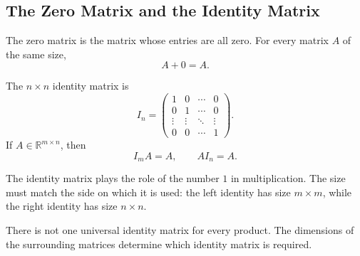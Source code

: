 \subsection{The Zero Matrix and the Identity Matrix}

\begin{definitionbox}
The zero matrix is the matrix whose entries are all zero. For every matrix $A$ of
the same size,
\[
A+0=A.
\]
\end{definitionbox}

\begin{definitionbox}
The $n\times n$ identity matrix is
\[
I_n=
\begin{pmatrix}
1&0&\cdots&0\\
0&1&\cdots&0\\
\vdots&\vdots&\ddots&\vdots\\
0&0&\cdots&1
\end{pmatrix}.
\]
If $A\in\mathbb R^{m\times n}$, then
\[
I_mA=A,
\qquad
AI_n=A.
\]
\end{definitionbox}

\begin{interpretationbox}
The identity matrix plays the role of the number $1$ in multiplication. The size
must match the side on which it is used: the left identity has size $m\times m$,
while the right identity has size $n\times n$.
\end{interpretationbox}

\begin{remarkbox}
There is not one universal identity matrix for every product. The dimensions of
the surrounding matrices determine which identity matrix is required.
\end{remarkbox}
